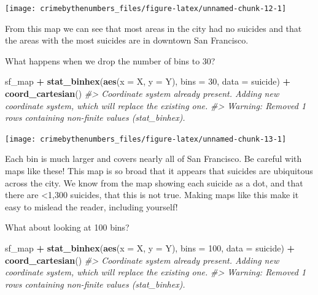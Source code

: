 \documentclass[
  12pt,
]{book}
\newenvironment{Shaded}{\begin{snugshade}}{\end{snugshade}}
\newcommand{\CommentTok}[1]{\textcolor[rgb]{0.37,0.37,0.37}{\textit{#1}}}
\newcommand{\DataTypeTok}[1]{\textcolor[rgb]{0.27,0.27,0.27}{#1}}
\newcommand{\DecValTok}[1]{\textcolor[rgb]{0.06,0.06,0.06}{#1}}
\newcommand{\KeywordTok}[1]{\textcolor[rgb]{0.27,0.27,0.27}{\textbf{#1}}}
\newcommand{\NormalTok}[1]{#1}
\newcommand{\OperatorTok}[1]{\textcolor[rgb]{0.43,0.43,0.43}{\textbf{#1}}}
\newcommand{\StringTok}[1]{\textcolor[rgb]{0.5,0.5,0.5}{#1}}
\begin{document}
\begin{center}\texttt{[image: crimebythenumbers\_files/figure-latex/unnamed-chunk-12-1]} \end{center}

From this map we can see that most areas in the city had no suicides and that the areas with the most suicides are in downtown San Francisco.

What happens when we drop the number of bins to 30?

\begin{Shaded}
\begin{Highlighting}[]
\NormalTok{sf\_map }\OperatorTok{+}
\StringTok{  }\KeywordTok{stat\_binhex}\NormalTok{(}\KeywordTok{aes}\NormalTok{(}\DataTypeTok{x =}\NormalTok{ X, }\DataTypeTok{y =}\NormalTok{ Y),}
              \DataTypeTok{bins =} \DecValTok{30}\NormalTok{,}
              \DataTypeTok{data =}\NormalTok{ suicide) }\OperatorTok{+}
\StringTok{  }\KeywordTok{coord\_cartesian}\NormalTok{() }
\CommentTok{\#\textgreater{} Coordinate system already present. Adding new coordinate system, which will replace the existing one.}
\CommentTok{\#\textgreater{} Warning: Removed 1 rows containing non{-}finite values (stat\_binhex).}
\end{Highlighting}
\end{Shaded}

\begin{center}\texttt{[image: crimebythenumbers\_files/figure-latex/unnamed-chunk-13-1]} \end{center}

Each bin is much larger and covers nearly all of San Francisco. Be careful with maps like these! This map is so broad that it appears that suicides are ubiquitous across the city. We know from the map showing each suicide as a dot, and that there are \textless1,300 suicides, that this is not true. Making maps like this make it easy to mislead the reader, including yourself!

What about looking at 100 bins?

\begin{Shaded}
\begin{Highlighting}[]
\NormalTok{sf\_map }\OperatorTok{+}
\StringTok{  }\KeywordTok{stat\_binhex}\NormalTok{(}\KeywordTok{aes}\NormalTok{(}\DataTypeTok{x =}\NormalTok{ X, }\DataTypeTok{y =}\NormalTok{ Y),}
              \DataTypeTok{bins =} \DecValTok{100}\NormalTok{,}
              \DataTypeTok{data =}\NormalTok{ suicide) }\OperatorTok{+}
\StringTok{  }\KeywordTok{coord\_cartesian}\NormalTok{() }
\CommentTok{\#\textgreater{} Coordinate system already present. Adding new coordinate system, which will replace the existing one.}
\CommentTok{\#\textgreater{} Warning: Removed 1 rows containing non{-}finite values (stat\_binhex).}
\end{Highlighting}
\end{Shaded}
\end{document}

